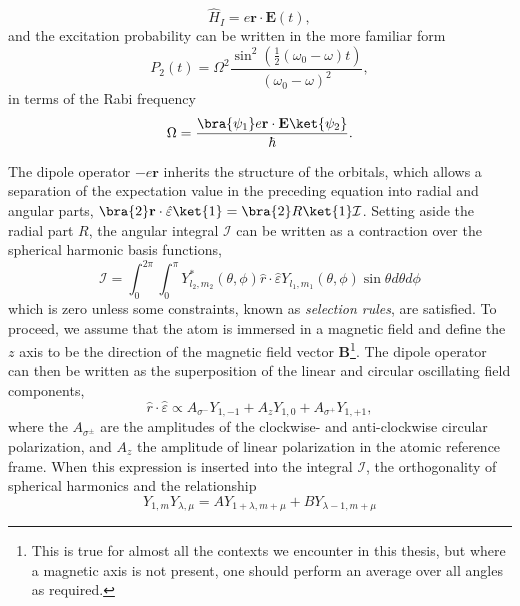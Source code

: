 	\begin{equation}
		\hat{H}_I = e\textbf{r}\cdot\textbf{E}(t),
	\end{equation}
	and the excitation probability can be written in the more familiar form \cite{FootAtomic,BinneyBook}
	\begin{equation}
		P_2(t) = \Omega^2 \frac{\sin^2(\frac{1}{2}(\omega_0-\omega)t)}{(\omega_0-\omega)^2},
		\label{eqn:transition_prob}
	\end{equation}
	in terms of the Rabi frequency
	\begin{equation}
		\Omega = \frac{\bra{\psi_1}e\textbf{r}\cdot\textbf{E}\ket{\psi_2}}{\hbar}.
	\end{equation}
	
	The dipole operator $-e\textbf{r}$ inherits the structure of the orbitals, which allows a separation of the expectation value in the preceding equation into radial and angular parts, $\bra{2}\textbf{r}\cdot\hat{\varepsilon}\ket{1} = \bra{2}R\ket{1}\mathcal{I}$. Setting aside the radial part $R$, the angular integral $\mathcal{I}$ can be written as a contraction over the spherical harmonic basis functions, 
	\begin{equation}
		\mathcal{I}=\int_{0}^{2\pi}\int_{0}^{\pi} Y^{*}_{l_2,m_2}(\theta,\phi)\hat{r}\cdot\hat{\varepsilon}Y_{l_1,m_1}(\theta,\phi)\sin\theta d\theta d\phi
	\end{equation} 
	which is zero unless some constraints, known as \emph{selection rules}, are satisfied. To proceed, we assume that the atom is immersed in a magnetic field and define the $z$ axis to be the direction of the magnetic field vector $\textbf{B}$\footnote{This is true for almost all the contexts we encounter in this thesis, but where a magnetic axis is not present, one should perform an average over all angles as required.}. The dipole operator can then be written as the superposition of the linear and circular oscillating field components,  
	\begin{equation}
		\hat{r}\cdot\hat{\varepsilon}\propto A_{\sigma^-}Y_{1,-1} + A_z Y_{1,0} + A_{\sigma^+}Y_{1,+1},
		\label{polz_decomp}
	\end{equation}
	where the $A_{\sigma^\pm}$ are the amplitudes of the clockwise- and anti-clockwise circular polarization, and $A_z$ the amplitude of linear polarization in the atomic reference frame. When this expression is inserted into the integral $\mathcal{I}$, the orthogonality of spherical harmonics and the relationship
	\begin{equation}
		Y_{1,m}Y_{\lambda,\mu}= A Y_{1+\lambda,m+\mu}+BY_{\lambda-1,m+\mu}
	\end{equation}
